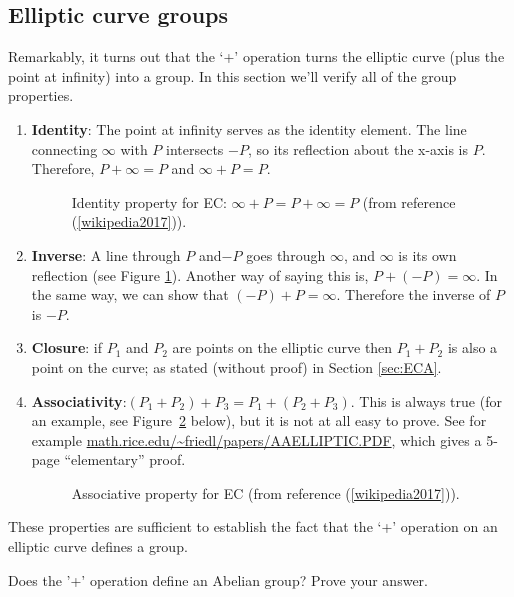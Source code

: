 \subsection{Elliptic curve groups}
Remarkably, it turns out that the `+' operation turns the elliptic curve (plus the point at infinity)  into a group.  In this section we'll verify all of the group properties. 

\begin{enumerate}[1.]
\item \textbf{Identity}: The point at infinity serves as the identity element.  The line connecting $\infty$ with $P$ intersects $-P$, so its reflection about the x-axis is $P$. Therefore, $P + \infty = P$ and $\infty + P = P$. 
\begin{figure}[htbp]
	  \caption{\label{fig:DH:DHKE_13} Identity property for EC: $\infty + P = P + \infty = P$ (from reference (\ref{wikipedia2017})).}
\end{figure}
\item \textbf{Inverse}: A line through $P$ and$-P$ goes through $\infty$, and $\infty$ is its own reflection (see Figure \ref{fig:DH:DHKE_13}). Another way of saying this is, $P + (- P) = \infty$. In the same way, we can show that $(-P) + P = \infty$. Therefore the inverse of $P$ is $-P$. 

\item \textbf{Closure}: if $P_1$ and $P_2$ are points on the elliptic curve then $P_1 + P_2$ is also a point on the curve; as stated (without proof) in Section \ref{sec:ECA}.
\item \textbf{Associativity}:$(P_1 + P_2) + P_3 = P_1 + (P_2 + P_3)$. This is always true (for an example, see Figure~\ref{fig:DH:DHKE_12} below),  but it is not at all easy to prove. See for example \url{math.rice.edu/~friedl/papers/AAELLIPTIC.PDF}, which gives a 5-page ``elementary'' proof.
\begin{figure}[htbp]
	  \caption{\label{fig:DH:DHKE_12} Associative property for EC (from reference (\ref{wikipedia2017})).}
\end{figure}
\end{enumerate}

These properties are sufficient to establish the fact that the `+' operation on an elliptic curve defines a group.

\begin{exercise}\label{exercise:further_crypt:}
Does the '+' operation define an Abelian group? Prove your answer.
\end{exercise}

